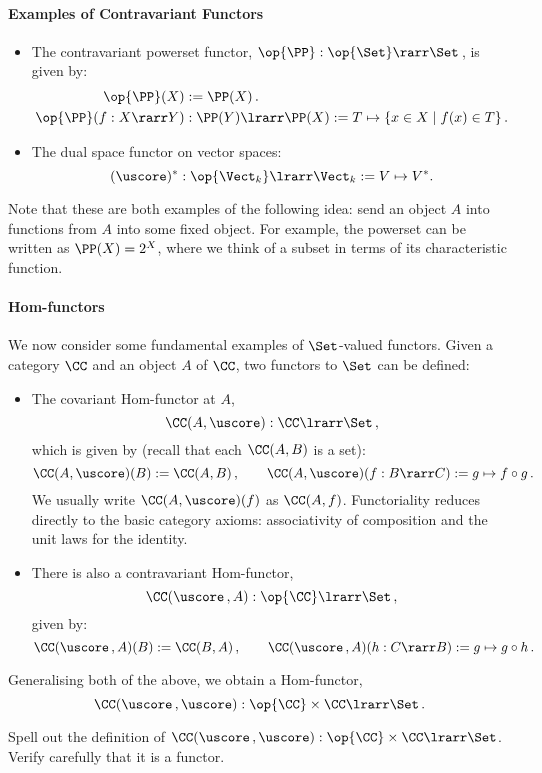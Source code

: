 \documentclass[12pt]{article}
\begin{document}
\paragraph{Examples of Contravariant Functors}
\begin{itemize}
\item The contravariant powerset functor, $\op{\PP}: \op{\Set}\rarr \Set$\,, is given by:
\begin{align*}
\op{\PP}(X)&:=\PP(X)\,. \\
\op{\PP}(f:X\rarr Y) &: \PP(Y) \lrarr \PP(X) := T \mapsto \{ x \in X \mid f(x) \in T \}\,.
\end{align*}
\item The dual space functor on vector spaces:
\[  (\uscore)^{*}:\op{\Vect_k} \lrarr \Vect_k := V \mapsto V^{*} . \]
\end{itemize}
%
Note that these are both examples of the following idea: send an object $A$ into functions from $A$ into some fixed object. For example, the powerset can be written as $\PP(X) = 2^{X}$, where we think of a subset in terms of its characteristic function.

\paragraph{Hom-functors} We now consider some fundamental examples of $\Set$-valued functors. Given a category $\CC$ and an object $A$ of $\CC$, two  functors to $\Set$ can be defined:
\begin{itemize}
\item The covariant Hom-functor at $A$,
\[ \CC (A,\uscore) : \CC \lrarr \Set\,, \]
which is given by (recall that each $\CC(A,B)$ is a set):
\[  \CC (A,\uscore)(B) :=  \CC (A, B)\,, \qquad \CC (A,\uscore)(f : B \rarr C) := g \mapsto f \circ g\,. \]
We usually write $\CC(A,\uscore)(f)$ as $\CC(A,f)$. Functoriality reduces directly to the basic category axioms: associativity of composition and the unit laws for the
identity.
\item There is also a contravariant Hom-functor,
\[ \CC (\uscore\,,A) : \op{\CC} \lrarr \Set\,, \]
given by:
\[ \CC (\uscore\,,A)(B) := \CC (B,A)\,, \qquad \CC (\uscore\,,A)(h : C \rarr B) := g \mapsto g \circ h\,. \]
\end{itemize}
Generalising both of the above, we obtain a  Hom-functor,
\[ \CC(\uscore\,,\uscore) : \op{\CC} \times \CC \lrarr \Set\,. \]
\begin{myexercise}
Spell out  the definition of $\CC(\uscore\,,\uscore) : \op{\CC} \times \CC \lrarr \Set$. Verify carefully that it is a functor.
\end{myexercise}
\end{document}
